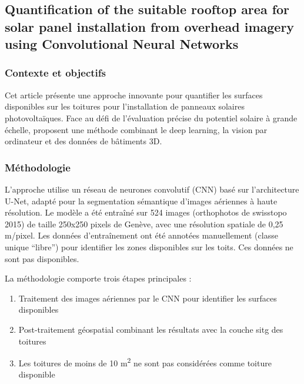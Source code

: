 \subsection{Quantification of the suitable rooftop area for solar panel installation from overhead imagery using Convolutional Neural Networks}
\label{subsec:castello_quantification_2021}

\subsubsection{Contexte et objectifs}
\par{Cet article \cite{castello_quantification_2021} présente une approche innovante pour quantifier les surfaces disponibles sur les toitures pour l'installation de panneaux solaires photovoltaïques. Face au défi de l'évaluation précise du potentiel solaire à grande échelle, \citeauthor{castello_quantification_2021} proposent une méthode combinant le deep learning, la vision par ordinateur et des données de bâtiments 3D.}

\subsubsection{Méthodologie}
\par{L'approche utilise un réseau de neurones convolutif (CNN) basé sur l'architecture U-Net, adapté pour la segmentation sémantique d'images aériennes à haute résolution. Le modèle a été entraîné sur 524 images (orthophotos de swisstopo 2015) de taille 250x250 pixels de Genève, avec une résolution spatiale de 0,25 m/pixel. Les données d'entraînement ont été annotées manuellement (classe unique ``libre'') pour identifier les zones disponibles sur les toits. Ces données ne sont pas disponibles.}

\par{La méthodologie comporte trois étapes principales :}
\begin{enumerate}
    \item Traitement des images aériennes par le CNN pour identifier les surfaces disponibles
    \item Post-traitement géospatial combinant les résultats avec la couche \acrshort{sitg} des toitures
    \item Les toitures de moins de 10 \si{\unit{\square\meter}} ne sont pas considérées comme toiture disponible
\end{enumerate}

